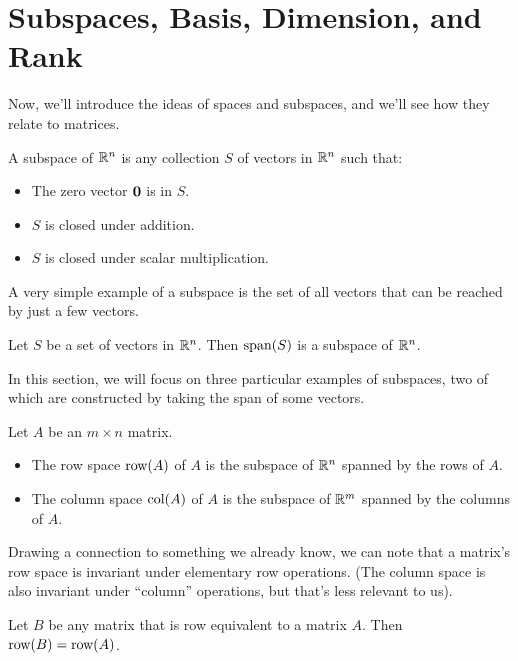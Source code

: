 \documentclass[../m73main.tex]{subfiles}
\begin{document}
\section{Subspaces, Basis, Dimension, and Rank}
Now, we'll introduce the ideas of spaces and subspaces, and we'll see how they relate to matrices.

\begin{definition}[Subspace]
	A subspace of $\mathbb{R}^n$ is any collection $S$ of vectors in $\mathbb{R}^n$ such that:
	\begin{itemize}
		\item The zero vector $\mathbf{0}$ is in $S$.
		\item $S$ is closed under addition.
		\item $S$ is closed under scalar multiplication.
	\end{itemize}
\end{definition}

A very simple example of a subspace is the set of all vectors that can be reached by just a few vectors.

\begin{theorem}
	Let $S$ be a set of vectors in $\mathbb{R}^n$.
	Then $\textrm{span}(S)$ is a subspace of $\mathbb{R}^n$.
\end{theorem}

In this section, we will focus on three particular examples of subspaces, two of which are constructed by taking the span of some vectors.

\begin{definition}
	Let $A$ be an $m\times n$ matrix.
	\begin{itemize}
		\item The row space $\textrm{row}(A)$ of $A$ is the subspace of $\mathbb{R}^n$ spanned by the rows of $A$.
		\item The column space $\textrm{col}(A)$ of $A$ is the subspace of $\mathbb{R}^m$ spanned by the columns of $A$.
	\end{itemize}
\end{definition}

Drawing a connection to something we already know, we can note that a matrix's row space is invariant under elementary row operations.
(The column space is also invariant under ``column'' operations, but that's less relevant to us).

\begin{theorem}
	Let $B$ be any matrix that is row equivalent to a matrix $A$.
	Then $\textrm{row}(B) = \textrm{row}(A)$.
\end{theorem}
\end{document}
